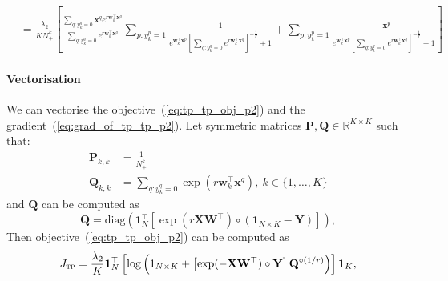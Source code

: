 \documentclass[9pt]{extarticle}
\newcommand{\x}{\mathbf{x}}
\newcommand{\1}{\mathbf{1}}
\newcommand{\w}{\mathbf{w}}
\newcommand{\Pb}{\mathbf{P}}
\newcommand{\Q}{\mathbf{Q}}
\newcommand{\W}{\mathbf{W}}
\newcommand{\X}{\mathbf{X}}
\newcommand{\Y}{\mathbf{Y}}
\newcommand{\R}{\mathbb{R}}
\newcommand{\one}{\mathbf{1}}
\newcommand{\diag}{\text{diag}}
\begin{document}
\begin{equation}
\begin{aligned}
&= \frac{\lambda_2}{KN_+^k} 
   \left[
   \frac{\sum_{q:y_k^q=0} \x^q e^{r \w_k^\top \x^q}}
        {\sum_{q:y_k^q=0}      e^{r \w_k^\top \x^q}}
   \sum_{p:y_k^p=1} 
   \frac{1} {e^{\w_k^\top \x^p} \left[ \sum_{q:y_k^q=0} e^{r \w_k^\top \x^q} \right]^{-\frac{1}{r}} + 1} +
   \sum_{p:y_k^p=1} 
   \frac{-\x^p} {e^{\w_k^\top \x^p} \left[ \sum_{q:y_k^q=0} e^{r \w_k^\top \x^q} \right]^{-\frac{1}{r}} + 1}
   \right]
\end{aligned}
\end{equation}

\paragraph{Vectorisation} We can vectorise the objective~(\ref{eq:tp_tp_obj_p2}) and the gradient~(\ref{eq:grad_of_tp_tp_p2}). %
Let symmetric matrices $\Pb, \Q \in \R^{K \times K}$ such that:
\begin{align*}
\Pb_{k, k} &= \frac{1}{N_+^k} \\
\Q_{k, k} &= \sum_{q:y_k^q=0} \exp \left( r \w_k^\top \x^q \right), \ k \in \{1,\dots,K\}
\end{align*}
and $\Q$ can be computed as 
$$
\Q = \diag \left( \one_{N}^\top \left[ \exp( r \X \W^\top ) \circ (\one_{N \times K} - \Y) \right] \right),
$$
Then objective~(\ref{eq:tp_tp_obj_p2}) can be computed as
$$
J_\textsc{tp} 
= \frac{\lambda_2}{K} 
\one_{N}^\top \left[ \log \left(1_{N \times K} + \left[ \exp(-\X \W^\top) \circ \Y \right] \Q^{\circ (1/r)} \right) \right] \one_{K},
$$
\end{document}
